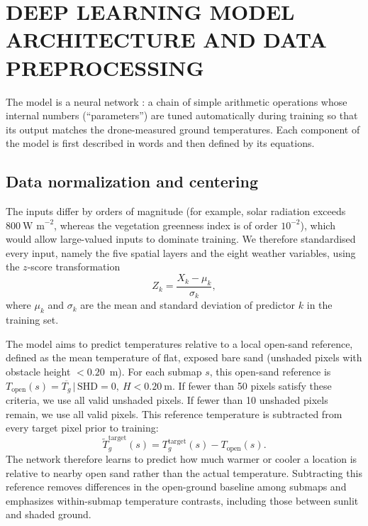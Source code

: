 \documentclass[12pt]{article}
\begin{document}
\section{DEEP LEARNING MODEL ARCHITECTURE AND DATA PREPROCESSING}

\noindent The model is a neural network \citep{lecun_2015}: a chain of simple arithmetic operations whose internal numbers (``parameters'') are tuned automatically during training so that its output matches the drone-measured ground temperatures. Each component of the model is first described in words and then defined by its equations.

\subsection{Data normalization and centering}

\noindent The inputs differ by orders of magnitude (for example, solar radiation exceeds $800~\text{W m}^{-2}$, whereas the vegetation greenness index is of order $10^{-2}$), which would allow large-valued inputs to dominate training. We therefore standardised every input, namely the five spatial layers and the eight weather variables, using the $z$-score transformation
\begin{equation} \label{eq:zscore}
Z_k = \frac{X_k - \mu_k}{\sigma_k},
\end{equation}
where $\mu_k$ and $\sigma_k$ are the mean and standard deviation of predictor $k$ in the training set.

The model aims to predict temperatures relative to a local open-sand reference, defined as the mean temperature of flat, exposed bare sand (unshaded pixels with obstacle height $< 0.20$~m). For each submap $s$, this open-sand reference is $T_{\text{open}}(s) = \overline{T_g}\,\big|\,\text{SHD}=0,\ H<0.20~\text{m}$. If fewer than 50 pixels satisfy these criteria, we use all valid unshaded pixels. If fewer than 10 unshaded pixels remain, we use all valid pixels. This reference temperature is subtracted from every target pixel prior to training:
\begin{equation}
\tilde{T}_g^{\text{target}}(s) = T_g^{\text{target}}(s) - T_{\text{open}}(s).
\end{equation}
The network therefore learns to predict how much warmer or cooler a location is relative to nearby open sand rather than the actual temperature. Subtracting this reference removes differences in the open-ground baseline among submaps and emphasizes within-submap temperature contrasts, including those between sunlit and shaded ground.
\end{document}
